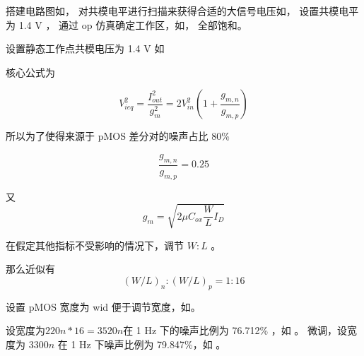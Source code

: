 \documentclass[lang=cn,11pt,a4paper,cite=authoryear]{elegantpaper}
\begin{document}





搭建电路图如， %
对共模电平进行扫描来获得合适的大信号电压如， %
设置共模电平为 1.4 V ，
通过 op 仿真确定工作区，如， %
全部饱和。

设置静态工作点共模电压为 1.4 V 如%





核心公式为


\[{V_{ieq}^2 = \frac{I_{out}^2}{g_m^2}} = 2 V_{in}^2 (1 + \frac{g_{m,n}}{g_{m,p}})\]

所以为了使得来源于 pMOS 差分对的噪声占比 80\% 

\[\frac{g_{m,n}}{g_{m,p}} = 0.25\]

又 \[g_m =\sqrt{2 \mu C_{o x} \frac{W}{L} I_{D}}\]

在假定其他指标不受影响的情况下，调节 \({W}:{L}\) 。

那么近似有\[(W/L)_n:(W/L)_p = 1:16\]

设置 pMOS 宽度为 wid 便于调节宽度，如。%


设宽度为\(220n * 16 = 3520 n\)在 1 Hz 下的噪声比例为 76.712\% ，如 。 %
微调，设宽度为 \(3300 n\) 在 1 Hz 下噪声比例为 79.847\%，如 。 %







\end{document}
